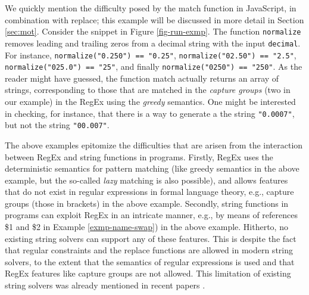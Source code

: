 \begin{example}\label{ex:normalize}
    We quickly mention the difficulty posed by the match function in JavaScript,
    in combination with replace; this example will be discussed in more
    detail in Section \ref{sec:mot}. Consider the snippet in Figure 
    \ref{fig-run-exmp}.
 The function {\tt normalize}   removes leading and trailing zeros from a decimal string with the input %
{\tt decimal}. For instance, 
 \texttt{normalize("0.250") == "0.25"},
 \texttt{normalize("02.50") == "2.5"},
 \texttt{normalize("025.0") == "25"},
and finally  \texttt{normalize("0250") == "250"}. As the reader might have
    guessed, the function match actually returns an array of strings,
    corresponding to those that are matched in the \emph{capture groups} (two 
    in our example) in the RegEx using the \emph{greedy} semantics. One might be
    interested in checking, for instance, that there is a way to generate a
    the string \texttt{"0.0007"}, but not the string \texttt{"00.007"}.
\end{example}



The above examples epitomize the difficulties that are arisen from the
interaction between RegEx and string functions in programs. Firstly,
RegEx uses the deterministic semantics for pattern matching (like greedy
semantics in the above example, but the so-called \emph{lazy} matching is
also possible), and allows features that do not exist in regular expressions in
formal language theory, e.g., capture groups (those in brackets) in the above
example. Secondly, string functions in programs can exploit RegEx in an
intricate manner, e.g., by means of references \$1 and \$2 in Example 
\ref{exmp-name-swap}) in the above example. Hitherto, no existing string solvers
can support any of these features. This is despite the fact that regular 
constraints and the replace functions are allowed in modern string solvers, 
to the extent that the semantics of regular expressions is used and that 
RegEx features like capture groups are not allowed. This limitation of existing
string solvers was already mentioned in recent papers \cite{aratha,LMK19}.

